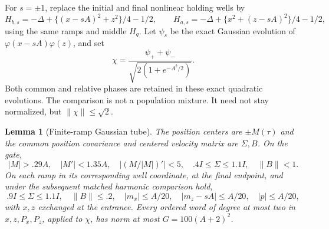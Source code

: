 \documentclass[11pt]{article}
\numberwithin{equation}{section}
\newtheorem{lemma}[theorem]{Lemma}
\theoremstyle{definition}
\theoremstyle{remark}
\begin{document}
For $s=\pm1$, replace the initial and final nonlinear holding wells
by
\[
 H_{b,s}=-\Delta+\{(x-sA)^2+z^2\}/4-1/2,\qquad
 H_{a,s}=-\Delta+\{x^2+(z-sA)^2\}/4-1/2,
\]
using the same ramps and middle $H_q$. Let $\psi_s$ be the exact
Gaussian evolution of $\varphi(x-sA)\varphi(z)$, and set
\begin{equation}\label{p2r:eq:comparison}
 \chi=\frac{\psi_++\psi_-}{\sqrt{2(1+e^{-A^2/2})}} .
\end{equation}
Both common and relative phases are retained in these exact
quadratic evolutions. The comparison is not a population mixture.
It need not stay normalized, but $\|\chi\|\leq\sqrt2$.

\begin{lemma}[Finite-ramp Gaussian tube]\label{p2r:lem:tube}
The position centers are $\pm M(\tau)$ and the common position
covariance and centered velocity matrix are $\Sigma,B$. On the gate,
\begin{equation}\label{p2r:eq:tube}
 |M|>.29A,\quad |M'|<1.35A,\quad |(M/|M|)'|<5,\quad
 .4I\leq\Sigma\leq1.1I,\quad \|B\|<1.
\end{equation}
On each ramp in its corresponding well coordinate, at the final
endpoint, and under the subsequent matched harmonic comparison hold,
\begin{equation}\label{p2r:eq:endtube}
 .9I\leq\Sigma\leq1.1I,\quad\|B\|\leq.2,\quad
 |m_x|\leq A/20,\quad |m_z-sA|\leq A/20,\quad |p|\leq A/20,
\end{equation}
with $x,z$ exchanged at the entrance.
Every ordered word of degree at most two in $x,z,P_x,P_z$, applied
to $\chi$, has norm at most $G=100(A+2)^2$.
\end{lemma}
\end{document}
